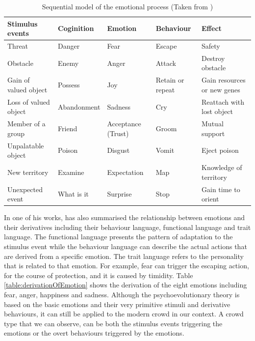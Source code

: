\begin{table}
\caption{Sequential model of the emotional process (Taken from \citet{plutchik2001integration})}
\label{table:sequentialModelOfEmotion}
\centering
\begin{tabular}{|p{2.5cm}|p{2.3cm}|p{2.3cm}|p{2.3cm}|p{3.5cm}|}
\hline
\textbf{Stimulus events} & \textbf{Coginition} & \textbf{Emotion} & \textbf{Behaviour} & \textbf{Effect} \\ \hline \hline
Threat & Danger & Fear & Escape & Safety \\ \hline
Obstacle & Enemy & Anger & Attack & Destroy obstacle \\ \hline
Gain of valued object & Possess & Joy & Retain or repeat & Gain resources or new genes \\ \hline
Loss of valued object & Abandonment & Sadness & Cry & Reattach with lost object \\ \hline
Member of a group & Friend & Acceptance (Trust) & Groom & Mutual support \\ \hline
Unpalatable object & Poison & Disgust & Vomit & Eject poison \\ \hline
New territory & Examine & Expectation & Map & Knowledge of territory \\ \hline
Unexpected event & What is it & Surprise & Stop & Gain time to orient \\ \hline
\end{tabular}
\end{table}

In one of his works, \citet{plutchik2001integration} has also summarised the relationship between emotions and their derivatives including their behaviour language, functional language and trait language. The functional language presents the pattern of adaptation to the stimulus event while the behaviour language can describe the actual actions that are derived from a specific emotion. The trait language refers to the personality that is related to that emotion. For example, fear can trigger the escaping action, for the course of protection, and it is caused by timidity. Table \ref{table:derivationOfEmotion} shows the derivation of the eight emotions including fear, anger, happiness and sadness. Although the psychoevolutionary theory is based on the basic emotions and their very primitive stimuli and derivative behaviours, it can still be applied to the modern crowd in our context. A crowd type that we can observe, can be both the stimulus events triggering the emotions or the overt behaviours triggered by the emotions. 

